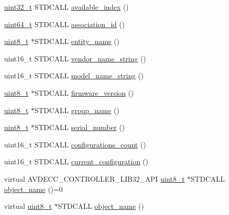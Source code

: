 \begin{DoxyCompactItemize}
\item 
\hyperlink{parse_8c_a6eb1e68cc391dd753bc8ce896dbb8315}{uint32\+\_\+t} S\+T\+D\+C\+A\+LL \hyperlink{classavdecc__lib_1_1entity__descriptor__response__imp_a8252677145c702c9ac4fbf00557a429d}{available\+\_\+index} ()
\item 
\hyperlink{parse_8c_aec6fcb673ff035718c238c8c9d544c47}{uint64\+\_\+t} S\+T\+D\+C\+A\+LL \hyperlink{classavdecc__lib_1_1entity__descriptor__response__imp_a59095fdff1e1f4c1e3796eb634835e23}{association\+\_\+id} ()
\item 
\hyperlink{stdint_8h_aba7bc1797add20fe3efdf37ced1182c5}{uint8\+\_\+t} $\ast$S\+T\+D\+C\+A\+LL \hyperlink{classavdecc__lib_1_1entity__descriptor__response__imp_a4a04c5e7745d94eeb7b4a669af474dfb}{entity\+\_\+name} ()
\item 
uint16\+\_\+t S\+T\+D\+C\+A\+LL \hyperlink{classavdecc__lib_1_1entity__descriptor__response__imp_aad57a8a03f37d9edf5c565eb492435c2}{vendor\+\_\+name\+\_\+string} ()
\item 
uint16\+\_\+t S\+T\+D\+C\+A\+LL \hyperlink{classavdecc__lib_1_1entity__descriptor__response__imp_aeda8c86e8d94b07005182b4dc8a32a2d}{model\+\_\+name\+\_\+string} ()
\item 
\hyperlink{stdint_8h_aba7bc1797add20fe3efdf37ced1182c5}{uint8\+\_\+t} $\ast$S\+T\+D\+C\+A\+LL \hyperlink{classavdecc__lib_1_1entity__descriptor__response__imp_a785a038656ec98887840c83d971d9468}{firmware\+\_\+version} ()
\item 
\hyperlink{stdint_8h_aba7bc1797add20fe3efdf37ced1182c5}{uint8\+\_\+t} $\ast$S\+T\+D\+C\+A\+LL \hyperlink{classavdecc__lib_1_1entity__descriptor__response__imp_aab02c85d63c74d2a2b937756161ef272}{group\+\_\+name} ()
\item 
\hyperlink{stdint_8h_aba7bc1797add20fe3efdf37ced1182c5}{uint8\+\_\+t} $\ast$S\+T\+D\+C\+A\+LL \hyperlink{classavdecc__lib_1_1entity__descriptor__response__imp_a57cc0851b27956c69aaba5e2cf8009b7}{serial\+\_\+number} ()
\item 
uint16\+\_\+t S\+T\+D\+C\+A\+LL \hyperlink{classavdecc__lib_1_1entity__descriptor__response__imp_ae9a0fecdb150963de400746eddc197ae}{configurations\+\_\+count} ()
\item 
uint16\+\_\+t S\+T\+D\+C\+A\+LL \hyperlink{classavdecc__lib_1_1entity__descriptor__response__imp_a7e1b33859fe1d76e8584c30a14c5523a}{current\+\_\+configuration} ()
\item 
virtual A\+V\+D\+E\+C\+C\+\_\+\+C\+O\+N\+T\+R\+O\+L\+L\+E\+R\+\_\+\+L\+I\+B32\+\_\+\+A\+PI \hyperlink{stdint_8h_aba7bc1797add20fe3efdf37ced1182c5}{uint8\+\_\+t} $\ast$S\+T\+D\+C\+A\+LL \hyperlink{classavdecc__lib_1_1descriptor__response__base_a133f7774946d80f82b8aaaa4cfbb7361}{object\+\_\+name} ()=0
\item 
virtual \hyperlink{stdint_8h_aba7bc1797add20fe3efdf37ced1182c5}{uint8\+\_\+t} $\ast$S\+T\+D\+C\+A\+LL \hyperlink{classavdecc__lib_1_1descriptor__response__base__imp_a15837e3eb254ad44812cb766ae8cd53c}{object\+\_\+name} ()
\end{DoxyCompactItemize}

